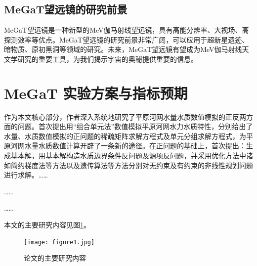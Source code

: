 \subsection{MeGaT望远镜的研究前景}
MeGaT望远镜是一种新型的MeV伽马射线望远镜，具有高能分辨率、大视场、高探测效率等优点。MeGaT望远镜的研究前景非常广阔，可以应用于超新星遗迹、暗物质、原初黑洞等领域的研究。未来，MeGaT望远镜有望成为MeV伽马射线天文学研究的重要工具，为我们揭示宇宙的奥秘提供重要的信息。\par


\section{MeGaT 实验方案与指标预期}
作为本文核心部分，作者深入系统地研究了平原河网水量水质数值模拟的正反两方面的问题。首次提出用“组合单元法”数值模拟平原河网水力水质特性，分别给出了水量、水质数值模拟的正问题的稀疏矩阵求解方程式及单元分组求解方程式，为平原河网水量水质数值计算开辟了一条新的途径。在正问题的基础上，首次提出：生成基本解，用基本解构造水质边界条件反问题及源项反问题，并采用优化方法中诸如简约梯度法等方法以及遗传算法等方法分别对无约束及有约束的非线性规划问题进行求解。……\par
……\par
……\par
本文的主要研究内容见图\ref{fig:maincontents}。

\begin{figure}[H]
	\centering
	\texttt{[image: figure1.jpg]}
	\caption{论文的主要研究内容} \label{fig:maincontents}
\end{figure}

